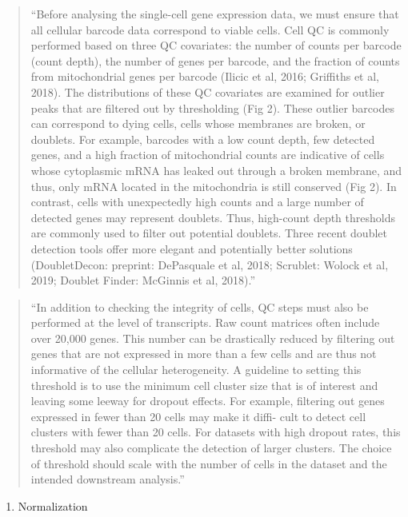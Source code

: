 \documentclass[
]{book}
\providecommand{\tightlist}{%
  \setlength{\itemsep}{0pt}\setlength{\parskip}{0pt}}
\begin{document}
\begin{quote}
``Before analysing the single-cell gene expression data, we must ensure that
all cellular barcode data correspond to viable cells. Cell QC is commonly
performed based on three QC covariates: the number of counts per barcode (count
depth), the number of genes per barcode, and the fraction of counts from
mitochondrial genes per barcode (Ilicic et al, 2016; Griffiths et al, 2018). The
distributions of these QC covariates are examined for outlier peaks that are
filtered out by thresholding (Fig 2). These outlier barcodes can correspond to
dying cells, cells whose membranes are broken, or doublets. For example,
barcodes with a low count depth, few detected genes, and a high fraction of
mitochondrial counts are indicative of cells whose cytoplasmic mRNA has leaked
out through a broken membrane, and thus, only mRNA located in the mitochondria
is still conserved (Fig 2). In contrast, cells with unexpectedly high counts and
a large number of detected genes may represent doublets. Thus, high-count depth
thresholds are commonly used to filter out potential doublets. Three recent
doublet detection tools offer more elegant and potentially better solutions
(DoubletDecon: preprint: DePasquale et al, 2018; Scrublet: Wolock et al, 2019;
Doublet Finder: McGinnis et al, 2018).'' \citep{luecken2019current}
\end{quote}

\begin{quote}
``In addition to checking the integrity of cells, QC steps must also be
performed at the level of transcripts. Raw count matrices often include over
20,000 genes. This number can be drastically reduced by filtering out genes that
are not expressed in more than a few cells and are thus not informative of the
cellular heterogeneity. A guideline to setting this threshold is to use the
minimum cell cluster size that is of interest and leaving some leeway for
dropout effects. For example, filtering out genes expressed in fewer than 20
cells may make it diffi- cult to detect cell clusters with fewer than 20 cells.
For datasets with high dropout rates, this threshold may also complicate the
detection of larger clusters. The choice of threshold should scale with the
number of cells in the dataset and the intended downstream analysis.''
\citep{luecken2019current}
\end{quote}

\begin{enumerate}
\def\labelenumi{\arabic{enumi}.}
\setcounter{enumi}{2}
\tightlist
\item
  Normalization
\end{enumerate}
\end{document}
